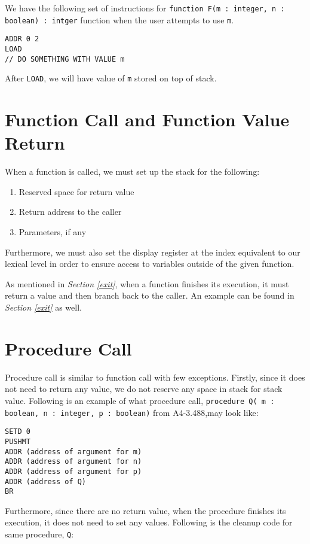 \documentclass{article}
\begin{document}
We have the following set of instructions for {\tt function F(m : integer, n : boolean) : intger} function when the user attempts to use {\tt m}.

\begin{lstlisting}
ADDR 0 2
LOAD
// DO SOMETHING WITH VALUE m
\end{lstlisting}

After {\tt LOAD}, we will have value of {\tt m} stored on top of stack.

\section{Function Call and Function Value Return}

When a function is called, we must set up the stack for the following:

\begin{enumerate}
	\item Reserved space for return value
	\item Return address to the caller
	\item Parameters, if any
\end{enumerate}

Furthermore, we must also set the display register at the index equivalent to our lexical level in order to ensure access to variables outside of the given function.

As mentioned in {\it Section \ref{exit}}, when a function finishes its execution, it must return a value and then branch back to the caller. An example can be found in {\it Section \ref{exit}} as well.

\section{Procedure Call}

Procedure call is similar to function call with few exceptions. Firstly, since it does not need to return any value, we do not reserve any space in stack for stack value. Following is an example of what procedure call, {\tt procedure Q( m : boolean, n : integer, p : boolean)} from A4-3.488,may look like:

\begin{lstlisting}
SETD 0
PUSHMT
ADDR (address of argument for m)
ADDR (address of argument for n)
ADDR (address of argument for p)
ADDR (address of Q)
BR
\end{lstlisting}

Furthermore, since there are no return value, when the procedure finishes its execution, it does not need to set any values. Following is the cleanup code for same procedure, {\tt Q}:
\end{document}
